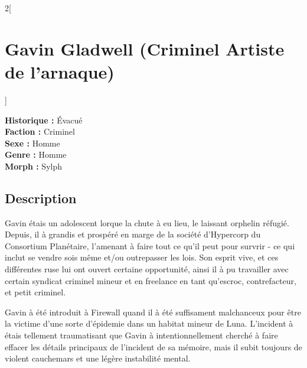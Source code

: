 \documentclass[a4paper,9pt]{article}
\begin{document}
\newpage

\begin{multicols}{2}[\section*{Gavin Gladwell (Criminel Artiste de l'arnaque)}]

   \noindent\textbf{Historique :} Évacué\\
   \noindent\textbf{Faction :} Criminel\\
   \noindent\textbf{Sexe :} Homme\\
   \noindent\textbf{Genre :} Homme\\
   \noindent\textbf{Morph :} Sylph\\

   \subsection*{Description}

   Gavin étais un adolescent lorque la chute à eu lieu, le laissant orphelin réfugié.
   Depuis, il à grandis et prospéré en marge de la société d'Hypercorp du
   Consortium Planétaire, l'amenant à faire tout ce qu'il peut pour survrir - ce
   qui inclut se vendre sois même et/ou outrepasser les lois.
   Son esprit vive, et ces différentes ruse lui ont ouvert certaine opportunité,
   ainsi il à pu travailler avec certain syndicat criminel mineur et en freelance
   en tant qu'escroc, contrefacteur, et petit criminel.

   Gavin à été introduit à Firewall quand il à été suffisament malchanceux pour
   être la victime d'une sorte d'épidemie dans un habitat mineur de Luna.
   L'incident à étais tellement traumatisant que Gavin à intentionnellement
   cherché à faire effacer les détails principaux de l'incident de sa mémoire,
   mais il subit toujours de violent cauchemars et une légère instabilité mental.


\end{multicols}
\end{document}
